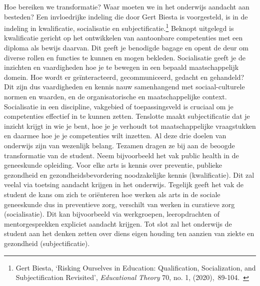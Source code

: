 \documentclass[smallauthor, chapterhaspagenum, nochapterinheader, pagenuminheader,  bigchapnum,medium2, tocpages,  garamond, titleinheader]{jote-book}
\begin{document}
	Hoe bereiken we transformatie? Waar moeten we in het onderwijs aandacht aan besteden? Een invloedrijke indeling die door Gert Biesta is voorgesteld, is in de indeling in kwalificatie, socialisatie en subjectificatie.\footnote{Gert Biesta, ‘Risking Ourselves in Education: Qualification, Socialization, and Subjectification Revisited', \emph{Educational}\emph{ }\emph{Theory}\emph{ }70, no. 1, (2020), 89-104. } Beknopt uitgelegd is kwalificatie gericht op het ontwikkelen van aantoonbare competenties met een diploma als bewijs daarvan. Dit geeft je benodigde bagage en opent de deur om diverse rollen en functies te kunnen en mogen bekleden. Socialisatie geeft je de inzichten en vaardigheden hoe je te bewegen in een bepaald maatschappelijk domein. Hoe wordt er geïnteracteerd, gecommuniceerd, gedacht en gehandeld? Dit zijn dus vaardigheden en kennis nauw samenhangend met sociaal-culturele normen en waarden, en de organisatorische en maatschappelijke context. Socialisatie in een discipline, vakgebied of toepassingsveld is cruciaal om je competenties effectief in te kunnen zetten. Tenslotte maakt subjectificatie dat je inzicht krijgt in wie je bent, hoe je je verhoudt tot maatschappelijke vraagstukken en daarmee hoe je je competenties wilt inzetten. Al deze drie doelen van onderwijs zijn van wezenlijk belang. Tezamen dragen ze bij aan de beoogde transformatie van de student. Neem bijvoorbeeld het vak public health in de geneeskunde opleiding. Voor elke arts is kennis over preventie, publieke gezondheid en gezondheidsbevordering noodzakelijke kennis (kwalificatie). Dit zal veelal via toetsing aandacht krijgen in het onderwijs. Tegelijk geeft het vak de student de kans om zich te oriënteren hoe werken als arts in de sociale geneeskunde dus in preventieve zorg, verschilt van werken in curatieve zorg (socialisatie). Dit kan bijvoorbeeld via werkgroepen, leeropdrachten of mentorgesprekken expliciet aandacht krijgen. Tot slot zal het onderwijs de student aan het denken zetten over diens eigen houding ten aanzien van ziekte en gezondheid (subjectificatie).
\end{document}
